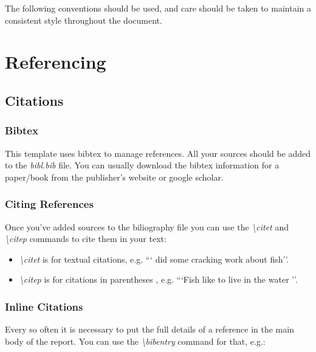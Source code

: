 \documentclass{BCUReport}
\begin{document}
\begin{appendices}
    The following conventions should be used, and care should be taken to maintain a consistent style throughout the document.
 
\section{Referencing}
\label{sec:Referencing}
    \subsection{Citations}
    \label{sec:Citations}
    
        \subsubsection{Bibtex}
            This template uses bibtex to manage references. All your sources should be added to the \textit{bibl.bib} file. You can usually download the bibtex information for a paper/book from the publisher's website or google scholar.

        \subsubsection{Citing References}
            Once you've added sources to the biliography file you can use the \textit{\textbackslash citet} and \textit{\textbackslash citep} commands to cite them in your text:
        
            \begin{itemize}
                \item \textit{\textbackslash citet} is for textual citations, e.g. ```\citet{hmgovernment2007} did some cracking work about fish''.
                \item \textit{\textbackslash citep} is for citations in parentheses , e.g. ```Fish like to live in the water \citep{hmgovernment2007}''.
            \end{itemize}
    
        \subsubsection{Inline Citations}
            Every so often it is necessary to put the full details of a reference in the main body of the report. You can use the \textit{\textbackslash bibentry} command for that, e.g.:
        


\end{appendices}
\end{document}
